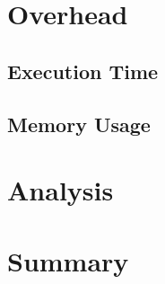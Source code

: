 \section{Overhead} \label{sec:results/overhead}
	\subsection{Execution Time} \label{sec:results/overhead/time}
	
	\subsection{Memory Usage} \label{sec:results/overhead/memory}

\section{Analysis} \label{sec:results/analysis}

\section{Summary} \label{sec:results/summary}